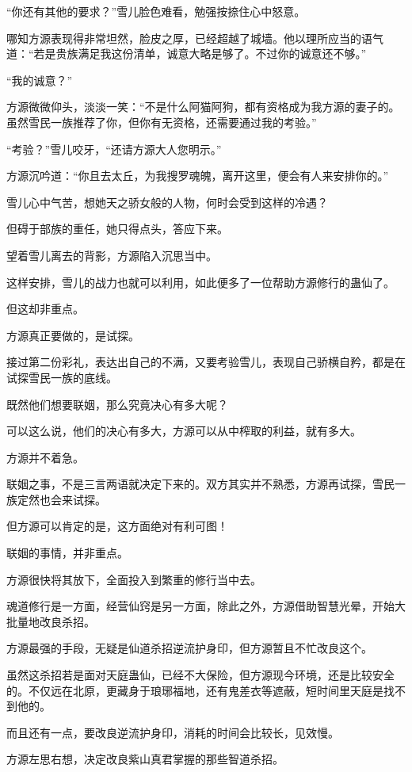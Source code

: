 \begin{this_body}
“你还有其他的要求？”雪儿脸色难看，勉强按捺住心中怒意。

哪知方源表现得非常坦然，脸皮之厚，已经超越了城墙。他以理所应当的语气道：“若是贵族满足我这份清单，诚意大略是够了。不过你的诚意还不够。”

“我的诚意？”

方源微微仰头，淡淡一笑：“不是什么阿猫阿狗，都有资格成为我方源的妻子的。虽然雪民一族推荐了你，但你有无资格，还需要通过我的考验。”

“考验？”雪儿咬牙，“还请方源大人您明示。”

方源沉吟道：“你且去太丘，为我搜罗魂魄，离开这里，便会有人来安排你的。”

雪儿心中气苦，想她天之骄女般的人物，何时会受到这样的冷遇？

但碍于部族的重任，她只得点头，答应下来。

望着雪儿离去的背影，方源陷入沉思当中。

这样安排，雪儿的战力也就可以利用，如此便多了一位帮助方源修行的蛊仙了。

但这却非重点。

方源真正要做的，是试探。

接过第二份彩礼，表达出自己的不满，又要考验雪儿，表现自己骄横自矜，都是在试探雪民一族的底线。

既然他们想要联姻，那么究竟决心有多大呢？

可以这么说，他们的决心有多大，方源可以从中榨取的利益，就有多大。

方源并不着急。

联姻之事，不是三言两语就决定下来的。双方其实并不熟悉，方源再试探，雪民一族定然也会来试探。

但方源可以肯定的是，这方面绝对有利可图！

联姻的事情，并非重点。

方源很快将其放下，全面投入到繁重的修行当中去。

魂道修行是一方面，经营仙窍是另一方面，除此之外，方源借助智慧光晕，开始大批量地改良杀招。

方源最强的手段，无疑是仙道杀招逆流护身印，但方源暂且不忙改良这个。

虽然这杀招若是面对天庭蛊仙，已经不大保险，但方源现今环境，还是比较安全的。不仅远在北原，更藏身于琅琊福地，还有鬼差衣等遮蔽，短时间里天庭是找不到他的。

而且还有一点，要改良逆流护身印，消耗的时间会比较长，见效慢。

方源左思右想，决定改良紫山真君掌握的那些智道杀招。


\end{this_body}
